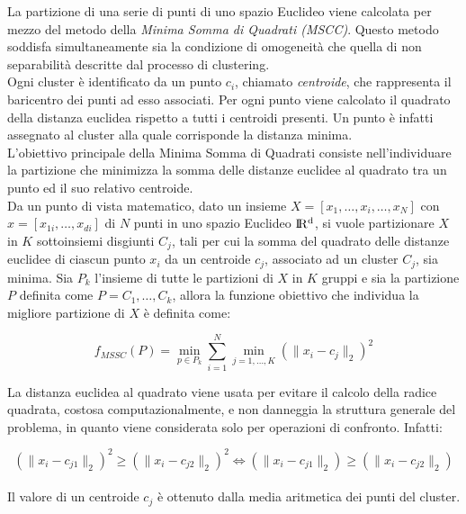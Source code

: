 \documentclass[12pt,a4paper,oneside,hidelinks]{report}
\begin{document}
La partizione di una serie di punti di uno spazio Euclideo viene calcolata per mezzo del metodo della \textit{Minima Somma di Quadrati (MSCC)}. Questo metodo soddisfa simultaneamente sia la condizione di omogeneità che quella di non separabilità descritte dal processo di clustering. \\ 
Ogni cluster è identificato da un punto $c_i$, chiamato \textit{centroide}, che rappresenta il baricentro dei punti ad esso associati.
Per ogni punto viene calcolato il quadrato della distanza euclidea rispetto a tutti i centroidi presenti. Un punto è infatti assegnato al cluster alla quale corrisponde la distanza minima. \\
L'obiettivo principale della Minima Somma di Quadrati consiste nell'individuare la partizione che minimizza la somma delle distanze euclidee al quadrato tra un punto ed il suo relativo centroide. \\
Da un punto di vista matematico, dato un insieme $X = [x_1, \dotsc ,x_i, \dots ,x_N]$ con $x = [x_{1i}, \dots ,x_{di}]$ di $N$ punti in uno spazio Euclideo $\rm I\!R^d$, si vuole partizionare $X$ in $K$ sottoinsiemi disgiunti $C_j$, tali per cui la somma del quadrato delle distanze euclidee di ciascun punto $x_i$ da un centroide $c_j$, associato ad un cluster $C_j$, sia minima.
Sia $P_k$ l'insieme di tutte le partizioni di $X$ in $K$ gruppi e sia la partizione $P$ definita come $P = {C_1, \dotsc ,C_k}$, allora la funzione obiettivo che individua la migliore partizione di $X$ è definita come:

\begin{equation}\label{zero}
	f_{MSSC}(P) = \min_{p \in P_k} \sum_{i=1}^{N} \min_{j =1, \dotsc ,K} (\| x_i - c_j \|_2)^2
\end{equation} 

La distanza euclidea al quadrato viene usata per evitare il calcolo della radice quadrata, costosa computazionalmente, e non danneggia la struttura generale del problema, in quanto viene considerata solo per operazioni di confronto. Infatti: 

\begin{equation}\label{uno}
	(\| x_i - c_{j1} \|_2)^2 \geq  (\| x_i - c_{j2} \|_2)^2 \Leftrightarrow  (\| x_i - c_{j1} \|_2) \geq  (\| x_i - c_{j2} \|_2)
\end{equation} 

\paragraph*{}
Il valore di un centroide $c_j$ è ottenuto dalla media aritmetica dei punti del cluster.
\end{document}
